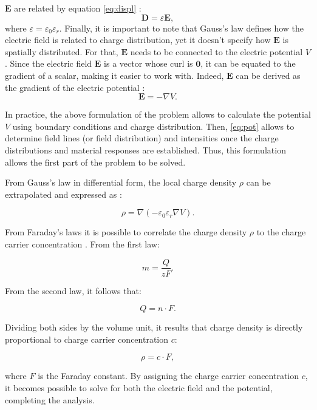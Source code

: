 $\mathbf{E}$ are related by equation \eqref{eq:displ}
\citep{griffithsIntroduction2023}: %
\begin{equation}
    \label{eq:displ}
    \mathbf{D} = \varepsilon \mathbf{E} ,
\end{equation}
where $\varepsilon = \varepsilon_0 \varepsilon_r$. Finally, it is important to
note that Gauss’s law defines how the electric field is related to charge
distribution, yet it doesn't specify how $\mathbf{E}$ is spatially distributed.
For that, $\mathbf{E}$ needs to be connected to the electric potential $V$.
Since the electric field $\mathbf{E}$ is a vector whose curl is $\mathbf{0}$, it
can be equated to the gradient of a scalar, making it easier to work with.
Indeed, $\mathbf{E}$ can be derived as the gradient of the electric potential
\citep{griffithsIntroduction2023}: %
\begin{equation}
    \label{eq:pot}
    \mathbf{E} = -\nabla V.
\end{equation}

In practice, the above formulation of the problem allows to calculate the
potential $V$ using boundary conditions and charge distribution. Then,
\eqref{eq:pot} allows to determine field lines (or field distribution) and
intensities once the charge distributions and material responses are
established. Thus, this formulation allows the first part of the problem to be
solved.

\begin{remark}
From Gauss’s law in differential form, the local charge density $\rho$ can be
extrapolated and expressed as \citep{griffithsIntroduction2023}: %

\begin{equation}
\rho = \nabla (-\varepsilon_0\varepsilon_r\nabla V).
\end{equation}

From Faraday's laws it is possible to correlate the charge density $\rho$ to the
charge carrier concentration \citep{bardElectrochemical2022}. From the first
law: %

\begin{equation}
m = \dfrac{Q}{zF}.
\end{equation}

From the second law, it follows that:

\begin{equation}
Q = n\cdot F.
\end{equation}

Dividing both sides by the volume unit, it results that charge density is
directly proportional to charge carrier concentration $c$:

\begin{equation}
\rho = c\cdot F,
\end{equation}

where $F$ is the Faraday constant. By assigning the charge carrier concentration
$c$, it becomes possible to solve for both the electric field and the potential,
completing the analysis.
\end{remark}

